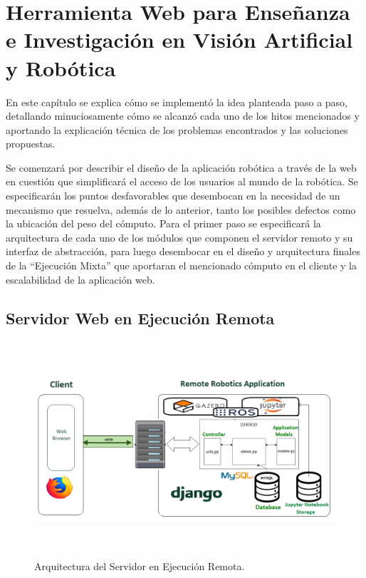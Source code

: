 \chapter{Herramienta Web para Enseñanza e Investigación en Visión Artificial y Robótica}
En este capítulo se explica cómo se implementó la idea planteada paso a paso, detallando minuciosamente cómo se alcanzó cada uno de los hitos mencionados y aportando la explicación técnica de los problemas encontrados y las soluciones propuestas.

Se comenzará por describir el diseño de la aplicación robótica a través de la web en cuestión que simplificará el acceso de los usuarios al mundo de la robótica. Se especificarán los puntos desfavorables que desembocan en la necesidad de un mecanismo que resuelva, además de lo anterior, tanto los posibles defectos como la ubicación del peso del cómputo. Para el primer paso se especificará la arquitectura de cada uno de los módulos que componen el servidor remoto y su interfaz de abstracción, para luego desembocar en el diseño y arquitectura finales de la ``Ejecución Mixta'' que aportaran el mencionado cómputo en el cliente y la escalabilidad de la aplicación web.

\section{Servidor Web en Ejecución Remota}

\begin{figure}[!ht]  \centering\noindent
    \includegraphics[width=1.20\textwidth,height=8cm]{figures/servidor_remoto_arquitectura.png}
    \caption{Arquitectura del Servidor en Ejecución Remota.}
    \label{remoteexecarch}
\end{figure}

